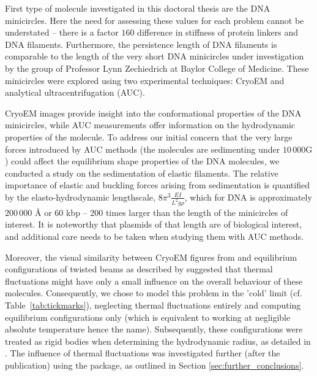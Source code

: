 \documentclass{doctoral}
\newcommand{\code}[1]{\texttt{\detokenize{#1}}}
\begin{document}
First type of molecule investigated in this doctoral thesis are the DNA minicircles.
Here the need for assessing these values for each problem cannot be understated -- there is a factor $160$ difference in stiffness of protein linkers and DNA filaments.
Furthermore, the persistence length of DNA filaments is comparable to the length of the very short DNA minicircles under investigation by the group of Professor Lynn Zechiedrich at Baylor College of Medicine.
These minicircles were explored using two experimental techniques: CryoEM\cite{Irobalieva_2015} and analytical ultracentrifugation (AUC)\cite{Waszkiewicz_2023_dna}.

CryoEM images provide insight into the conformational properties of the DNA minicircles, while AUC measurements offer information on the hydrodynamic properties of the molecule.
To address our initial concern that the very large forces introduced by AUC methods (the molecules are sedimenting under $10\,000\mathrm{G}$) could affect the equilibrium shape properties of the DNA molecules, we conducted a study on the sedimentation of elastic filaments\cite{Waszkiewicz_2021_stability}.
The relative importance of elastic and buckling forces arising from sedimentation is quantified by the elasto-hydrodynamic lengthscale, $8\pi^3 \frac{EI}{L^2 g\rho}$, which for DNA is approximately $200\,000 $ \AA{} or $60$ kbp -- 200 times larger than the length of the minicircles of interest.
It is noteworthy that plasmids of that length are of biological interest, and additional care needs to be taken when studying them with AUC methods.

Moreover, the visual similarity between CryoEM figures from \textcite{Irobalieva_2015} and equilibrium configurations of twisted beams as described by \textcite{Coleman_2000} suggested that thermal fluctuations might have only a small influence on the overall behaviour of these molecules.
Consequently, we chose to model this problem in the 'cold' limit (cf.
Table~\ref{tab:tickmarks}), neglecting thermal fluctuations entirely and computing equilibrium configurations only (which is equivalent to working at negligible absolute temperature hence the name).
Subsequently, these configurations were treated as rigid bodies when determining the hydrodynamic radius, as detailed in \textcite{Waszkiewicz_2023_dna}.
The influence of thermal fluctuations was investigated further (after the publication) using the \code{pychastic} package, as outlined in Section \ref{sec:further_conclusions}.
\end{document}
